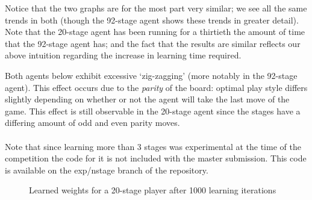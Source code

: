 \documentclass[11pt]{article}
\begin{document}
Notice that the two graphs are for the most part very similar; we see all the
same trends in both (though the 92-stage agent shows these trends in greater
detail). Note that the 20-stage agent has been running for a thirtieth the
amount of time that the 92-stage agent has; and the fact that the results are
similar reflects our above intuition regarding the increase in learning time
required.

Both agents below exhibit excessive `zig-zagging' (more notably in the
92-stage agent). This effect occurs due to the \emph{parity} of the board:
optimal play style differs slightly depending on whether or not the
agent will take the last move of the game. This effect is still observable in
the 20-stage agent since the stages have a differing amount of odd and even
parity moves.\\\\

Note that since learning more than 3 stages was experimental at the time of the
competition the code for it is not included with the master submission. This
code is available on the exp/nstage branch of the repository.

\begin{figure}[htbp]
  \centering
  \caption{Learned weights for a 20-stage player after 1000 learning
    iterations}
  \label{WeightsOverTime}
\end{figure}
\end{document}
